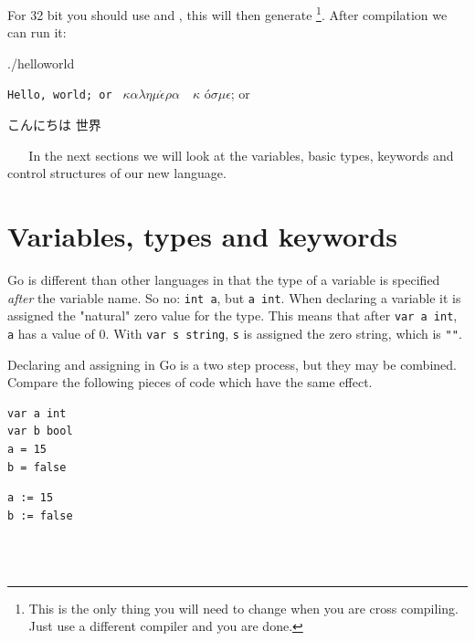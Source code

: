\noindent{}For 32 bit you should use  and , this will then
generate  \footnote{This is the only thing you will
need to change when you are cross compiling. Just use a different
compiler and you are done.}.
After compilation we can run it:
\begin{display}
\pr ./helloworld
\end{display}\texttt{Hello, world; or }%
\begin{math}\kappa\alpha\lambda\eta\mu\acute{\epsilon}\rho\alpha\hspace{1em}\kappa\end{math}%
\'o\begin{math} \sigma\mu\epsilon\end{math}; or \begin{cjk}こんにちは 世界\end{cjk}
\ \newline
\ \newline
In the next sections we will look at the variables, basic types,
keywords and  control structures of our new language. 


\section{Variables, types and keywords}
Go is different than other languages in that the type of a variable
is specified \emph{after} the variable name. So no: 
\lstinline{int a}, but \lstinline{a int}. When declaring a variable it
is assigned the "natural" zero value for the type. This means that after
\lstinline{var a int}, \lstinline{a} has a value of $0$. With
\lstinline{var s string}, \lstinline{s} is assigned the zero string,
which is \lstinline{""}. 

Declaring and assigning in Go is a two step process, but they may
be combined. Compare the following pieces of code which have
the same effect.

\begin{minipage}{.5\textwidth}
\begin{lstlisting}[linewidth=.5\textwidth,caption=Using \texttt{=}]
var a int
var b bool
a = 15
b = false
\end{lstlisting}
\hfill
\end{minipage}
\begin{minipage}{.5\textwidth}
\begin{lstlisting}[linewidth=.5\textwidth,caption=Using \texttt{:=}]
a := 15
b := false
\end{lstlisting}
\ \\
\ \\
\hfill
\end{minipage}

